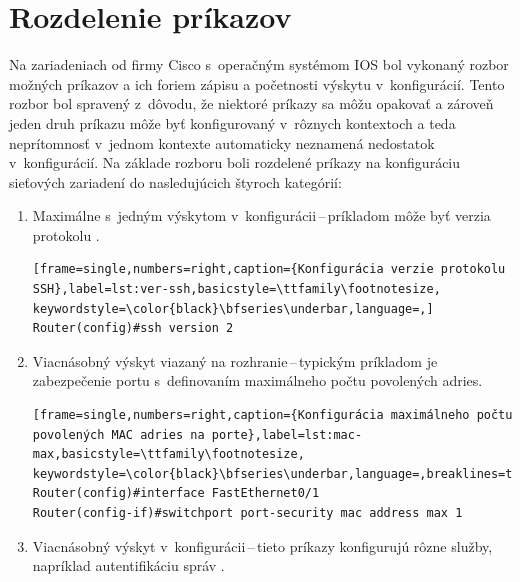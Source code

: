 \section{Rozdelenie príkazov}
Na zariadeniach od firmy Cisco s~operačným systémom IOS bol vykonaný rozbor možných príkazov a ich foriem zápisu a početnosti výskytu v~konfigurácií. Tento rozbor bol spravený z~dôvodu, že niektoré príkazy sa môžu opakovať a zároveň jeden druh príkazu môže byť konfigurovaný v~rôznych kontextoch a teda neprítomnosť v~jednom kontexte automaticky neznamená nedostatok v~konfigurácií. Na základe rozboru boli rozdelené príkazy na konfiguráciu sieťových zariadení do nasledujúcich štyroch kategórií:
\\
\begin{enumerate}
	\item Maximálne s~jedným výskytom v~konfigurácii\,--\,príkladom môže byť verzia protokolu .
	
\begin{minipage}{\linewidth}
	
\begin{lstlisting}[frame=single,numbers=right,caption={Konfigurácia verzie protokolu SSH},label=lst:ver-ssh,basicstyle=\ttfamily\footnotesize, keywordstyle=\color{black}\bfseries\underbar,language=,]
Router(config)#ssh version 2
\end{lstlisting}
\end{minipage}
	
	\item \vspace{2em} Viacnásobný výskyt viazaný na rozhranie\,--\,typickým príkladom je zabezpečenie portu s~definovaním maximálneho počtu povolených  adries.
	
\begin{minipage}{\linewidth}		
\begin{lstlisting}[frame=single,numbers=right,caption={Konfigurácia maximálneho počtu povolených MAC adries na porte},label=lst:mac-max,basicstyle=\ttfamily\footnotesize, keywordstyle=\color{black}\bfseries\underbar,language=,breaklines=true]
Router(config)#interface FastEthernet0/1
Router(config-if)#switchport port-security mac address max 1
\end{lstlisting}
\end{minipage}

	\item \vspace{2em} Viacnásobný výskyt v~konfigurácii\,--\,tieto príkazy konfigurujú rôzne služby, napríklad autentifikáciu správ .


\end{enumerate}
